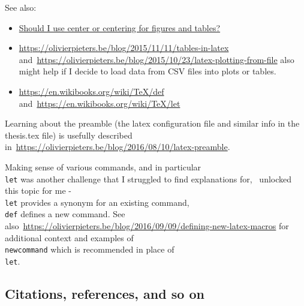 See also:
\begin{itemize}
    \item \href{https://tex.stackexchange.com/questions/2651/should-i-use-center-or-centering-for-figures-and-tables}{Should I use center or centering for figures and tables?}
    \item \url{https://olivierpieters.be/blog/2015/11/11/tables-in-latex} and~\url{https://olivierpieters.be/blog/2015/10/23/latex-plotting-from-file} also might help if I decide to load data from CSV files into plots or tables.
    \item \url{https://en.wikibooks.org/wiki/TeX/def} and~\url{https://en.wikibooks.org/wiki/TeX/let}
\end{itemize}

Learning about the preamble (the latex configuration file and similar info in the thesis.tex file) is usefully described in~\url{https://olivierpieters.be/blog/2016/08/10/latex-preamble}. 

Making sense of various commands, and in particular~\texttt{\\let} was another challenge that I struggled to find explanations for,~\citep{tex_stackechange_let_and_def} unlocked this topic for me -~\texttt{\\let} provides a synonym for an existing command,~\texttt{\\def} defines a new command. See also~\url{https://olivierpieters.be/blog/2016/09/09/defining-new-latex-macros} for additional context and examples of~\texttt{\\newcommand} which is recommended in place of~\texttt{\\let}.

\subsection{Citations, references, and so on}

